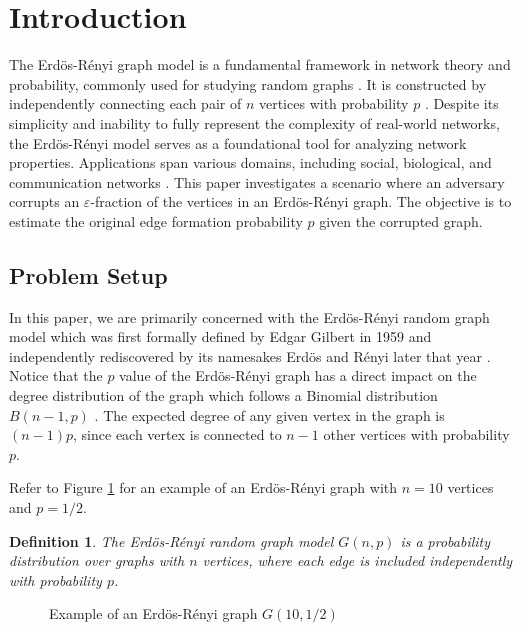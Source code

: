 \documentclass[10pt,onecolumn,letterpaper]{article}
\newtheorem{defin}[thm]{Definition}
\newcommand{\eps}{\varepsilon}
\newcommand{\erdos}{Erdös-Rényi }
\begin{document}
\section{Introduction}
The \erdos graph model is a fundamental framework in network theory and probability, commonly used for studying random graphs \cite{Albert_2002}. It is constructed by independently connecting each pair of $n$ vertices with probability $p$ \cite{Erds2022}. Despite its simplicity and inability to fully represent the complexity of real-world networks, the \erdos model serves as a foundational tool for analyzing network properties. Applications span various domains, including social, biological, and communication networks \cite{Albert_2002}. This paper investigates a scenario where an adversary corrupts an $\eps$-fraction of the vertices in an \erdos graph. The objective is to estimate the original edge formation probability $p$ given the corrupted graph.

\subsection{Problem Setup}
In this paper, we are primarily concerned with the \erdos random graph model which was first formally defined by Edgar Gilbert in 1959 and independently rediscovered by its namesakes Erdös and Rényi later that year \cite{Erds2022} \cite{Gilbert1959}. Notice that the $p$ value of the \erdos graph has a direct impact on the degree distribution of the graph which follows a Binomial distribution $B(n - 1,p)$ \cite{Newman2001}. The expected degree of any given vertex in the graph is $(n-1)p$, since each vertex is connected to $n - 1$ other vertices with probability $p$.

Refer to Figure \ref{erdos-renyi example} for an example of an \erdos graph with $n=10$ vertices and $p= 1 / 2$. 
\begin{defin}
  \label{\erdos Graph}
  The \erdos random graph model $G(n,p)$ is a probability distribution over graphs with $n$ vertices, where each edge is included independently with probability $p$.
\end{defin}

\begin{figure}[ht]
\centering
{}
\caption{Example of an \erdos graph $G(10, 1 / 2)$}
\label{erdos-renyi example}
\end{figure}
\end{document}
